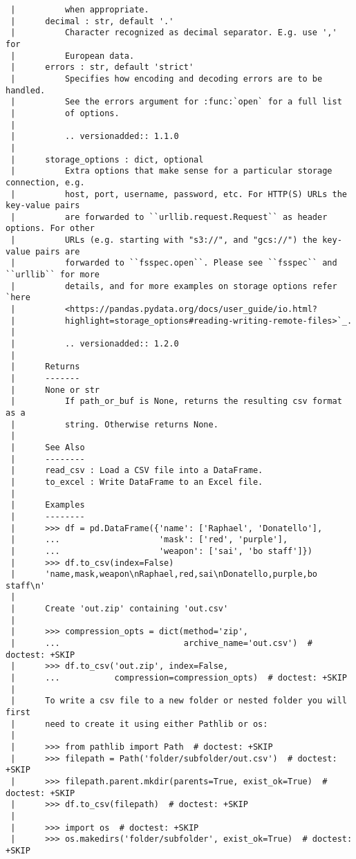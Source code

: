 \documentclass[
  letterpaper,
  DIV=11,
  numbers=noendperiod]{scrreprt}
\begin{document}
\begin{verbatim}
 |          when appropriate.
 |      decimal : str, default '.'
 |          Character recognized as decimal separator. E.g. use ',' for
 |          European data.
 |      errors : str, default 'strict'
 |          Specifies how encoding and decoding errors are to be handled.
 |          See the errors argument for :func:`open` for a full list
 |          of options.
 |      
 |          .. versionadded:: 1.1.0
 |      
 |      storage_options : dict, optional
 |          Extra options that make sense for a particular storage connection, e.g.
 |          host, port, username, password, etc. For HTTP(S) URLs the key-value pairs
 |          are forwarded to ``urllib.request.Request`` as header options. For other
 |          URLs (e.g. starting with "s3://", and "gcs://") the key-value pairs are
 |          forwarded to ``fsspec.open``. Please see ``fsspec`` and ``urllib`` for more
 |          details, and for more examples on storage options refer `here
 |          <https://pandas.pydata.org/docs/user_guide/io.html?
 |          highlight=storage_options#reading-writing-remote-files>`_.
 |      
 |          .. versionadded:: 1.2.0
 |      
 |      Returns
 |      -------
 |      None or str
 |          If path_or_buf is None, returns the resulting csv format as a
 |          string. Otherwise returns None.
 |      
 |      See Also
 |      --------
 |      read_csv : Load a CSV file into a DataFrame.
 |      to_excel : Write DataFrame to an Excel file.
 |      
 |      Examples
 |      --------
 |      >>> df = pd.DataFrame({'name': ['Raphael', 'Donatello'],
 |      ...                    'mask': ['red', 'purple'],
 |      ...                    'weapon': ['sai', 'bo staff']})
 |      >>> df.to_csv(index=False)
 |      'name,mask,weapon\nRaphael,red,sai\nDonatello,purple,bo staff\n'
 |      
 |      Create 'out.zip' containing 'out.csv'
 |      
 |      >>> compression_opts = dict(method='zip',
 |      ...                         archive_name='out.csv')  # doctest: +SKIP
 |      >>> df.to_csv('out.zip', index=False,
 |      ...           compression=compression_opts)  # doctest: +SKIP
 |      
 |      To write a csv file to a new folder or nested folder you will first
 |      need to create it using either Pathlib or os:
 |      
 |      >>> from pathlib import Path  # doctest: +SKIP
 |      >>> filepath = Path('folder/subfolder/out.csv')  # doctest: +SKIP
 |      >>> filepath.parent.mkdir(parents=True, exist_ok=True)  # doctest: +SKIP
 |      >>> df.to_csv(filepath)  # doctest: +SKIP
 |      
 |      >>> import os  # doctest: +SKIP
 |      >>> os.makedirs('folder/subfolder', exist_ok=True)  # doctest: +SKIP

\end{verbatim}
\end{document}
